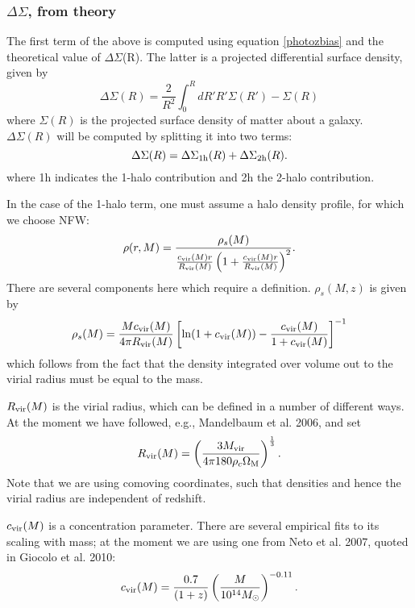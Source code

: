 \documentclass[onecolumn,amsmath,aps,fleqn, superscriptaddress]{revtex4}
\begin{document}
\subsubsection{$\Delta \Sigma$, from theory}
The first term of the above is computed using equation \ref{photozbias} and the theoretical value of $\Delta \Sigma$(R). The latter is a projected differential surface density, given by
\begin{equation}
\Delta \Sigma(R) = \frac{2}{R^2} \int_0^R dR' R' \Sigma(R') - \Sigma(R)
\label{DelSigDef}
\end{equation}
where $\Sigma(R)$ is the projected surface density of matter about a galaxy. $\Delta \Sigma(R)$ will be computed by splitting it into two terms:
\begin{equation}
\Delta\Sigma(R) = \Delta\Sigma_{{\rm 1h}}(R) + \Delta \Sigma_{{\rm 2h}}(R).
\label{DeltaSigterm}
\end{equation}
where 1h indicates the 1-halo contribution and 2h the 2-halo contribution.

In the case of the 1-halo term, one must assume a halo density profile, for which we choose NFW:
\begin{equation}
\rho(r, M) = \frac{\rho_s(M)}{\frac{c_{\rm vir}(M)r}{R_{\rm vir}(M)}\left(1+\frac{c_{\rm vir}(M)r}{R_{\rm vir}(M)}\right)^2}.
\label{nfw}
\end{equation}
There are several components here which require a definition. $\rho_s(M,z)$ is given by
\begin{equation}
\rho_s(M) = \frac{Mc_{\rm vir}(M)}{4 \pi R_{\rm vir}(M)}\left[{\rm ln} (1+ c_{\rm vir}(M)) - \frac{c_{\rm vir}(M)}{1+c_{\rm vir}(M)}\right]^{-1}
\label{rhos}
\end{equation}
which follows from the fact that the density integrated over volume out to the virial radius must be equal to the  mass.

$R_{\rm vir}(M)$ is the virial radius, which can be defined in a number of different ways. At the moment we have followed, e.g., Mandelbaum et al. 2006, and set
\begin{equation}
R_{\rm vir}(M) = \left(\frac{3 M_{\rm vir}}{4 \pi 180 \rho_c \Omega_{\rm M}} \right)^{\frac{1}{3}}.
\label{Rvir}
\end{equation}
Note that we are using comoving coordinates, such that densities and hence the virial radius are independent of redshift.

$c_{\rm vir}(M)$ is a concentration parameter. There are several empirical fits to its scaling with mass; at the moment we are using one from Neto et al. 2007, quoted in Giocolo et al. 2010:
\begin{equation}
c_{\rm vir}(M) = \frac{0.7}{(1+z)}\left(\frac{M}{10^{14}M_{\odot}}\right)^{-0.11}.
\label{cvir}
\end{equation}
\end{document}
